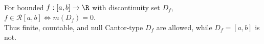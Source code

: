 \begin{perspective} \label{per:lebesgue-criterion-riemann-roadmap} \\
For bounded $f:[a,b]\to\R$ with discontinuity set $D_f$, $f\in\mathcal{R}[a,b]\Longleftrightarrow m(D_f)=0$.\\
Thus finite, countable, and null Cantor-type $D_f$ are allowed, while $D_f=[a,b]$ is not.
\end{perspective}
